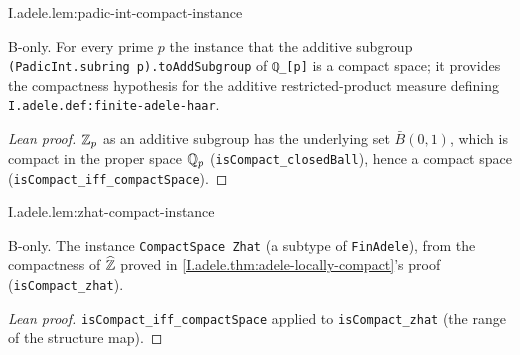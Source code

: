 \begin{lemma}[$\Zp$ is compact]
\bonly
{}
\end{lemma}
\begin{tfformal}{I.adele.lem:padic-int-compact-instance}
\begin{tffidelity}
B-only. For every prime $p$ the instance that the additive subgroup \texttt{(PadicInt.subring p).toAddSubgroup} of \texttt{ℚ\_[p]} is a compact space; it provides the compactness hypothesis for the additive restricted-product measure defining \texttt{I.adele.def:finite-adele-haar}.
\end{tffidelity}
\end{tfformal}
\begin{proof}[Lean proof]
$\mathbb{Z}_p$ as an additive subgroup has the underlying set $\bar B(0,1)$, which is compact in the proper space $\mathbb{Q}_p$ (\texttt{isCompact\_closedBall}), hence a compact space (\texttt{isCompact\_iff\_compactSpace}).
\end{proof}

\begin{lemma}
\bonly
{}
\end{lemma}
\begin{tfformal}{I.adele.lem:zhat-compact-instance}
\begin{tffidelity}
B-only. The instance \texttt{CompactSpace Zhat} (a subtype of \texttt{FinAdele}), from the compactness of $\widehat{\mathbb{Z}}$ proved in \cref{I.adele.thm:adele-locally-compact}'s proof (\texttt{isCompact\_zhat}).
\end{tffidelity}
\end{tfformal}
\begin{proof}[Lean proof]
\texttt{isCompact\_iff\_compactSpace} applied to \texttt{isCompact\_zhat} (the range of the structure map).
\end{proof}


